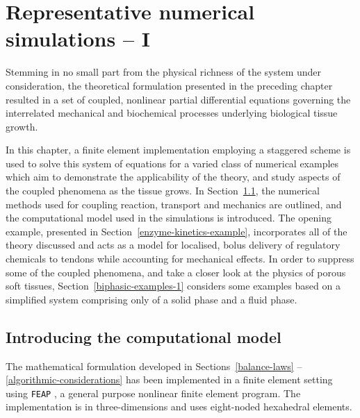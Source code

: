 \chapter{Representative numerical simulations -- I}
\label{numerical-simulations-1}

Stemming in no small part from the physical richness of the system
under consideration, the theoretical formulation presented in the
preceding chapter resulted in a set of coupled, nonlinear partial
differential equations governing the interrelated mechanical and
biochemical processes underlying biological tissue growth.

In this chapter, a finite element implementation employing a staggered
scheme is used to solve this system of equations for a varied class of
numerical examples which aim to demonstrate the applicability of the
theory, and study aspects of the coupled phenomena as the tissue
grows. In Section~\ref{computational-model}, the numerical methods
used for coupling reaction, transport and mechanics are outlined, and
the computational model used in the simulations is introduced. The
opening example, presented in Section~\ref{enzyme-kinetics-example},
incorporates all of the theory discussed and acts as a model for
localised, bolus delivery of regulatory chemicals to tendons while
accounting for mechanical effects. In order to suppress some of the
coupled phenomena, and take a closer look at the physics of porous
soft tissues, Section~\ref{biphasic-examples-1} considers some
examples based on a simplified system comprising only of a solid phase
and a fluid phase.%

\section{Introducing the computational model}
\label{computational-model}

The mathematical formulation developed in Sections~\ref{balance-laws}%
--\ref{algorithmic-considerations} has been implemented in a finite
element setting using {\tt FEAP} \citep{FEAPmanual}, a general purpose
nonlinear finite element program. The implementation is in
three-dimensions and uses eight-noded hexahedral elements.

